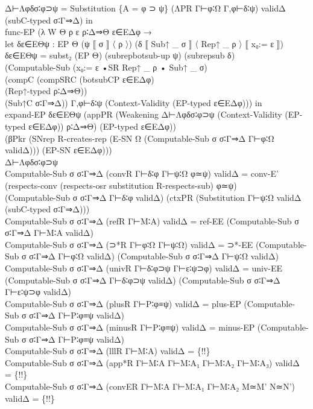 {\begin{code}
{\>      Δ⊢Λφδσ∶φ⊃ψ = Substitution \{A = φ ⊃ ψ\} (ΛPR Γ⊢φ∶Ω Γ,φ⊢δ∶ψ) validΔ (subC-typed σ∶Γ⇒Δ) in\<\\
\>  func-EP (λ W Θ ρ ε ρ∶Δ⇒Θ ε∈EΔφ → \<\\
\>    let δε∈EΘψ : EP Θ (ψ ⟦ σ ⟧ 〈 ρ 〉) (δ ⟦ Sub↑ \_ σ ⟧ 〈 Rep↑ \_ ρ 〉 ⟦ x₀:= ε ⟧)\<\\
\>        δε∈EΘψ = subst₂ (EP Θ) (subrepbotsub-up ψ) (subrepsub δ) \<\\
\>                 (Computable-Sub (x₀:= ε •SR Rep↑ \_ ρ • Sub↑ \_ σ) \<\\
\>                 (compC (compSRC (botsubCP ε∈EΔφ) \<\\
\>                        (Rep↑-typed ρ∶Δ⇒Θ)) \<\\
\>                 (Sub↑C σ∶Γ⇒Δ)) Γ,φ⊢δ∶ψ (Context-Validity (EP-typed ε∈EΔφ))) in\<\\
\>    expand-EP δε∈EΘψ (appPR (Weakening Δ⊢Λφδσ∶φ⊃ψ (Context-Validity (EP-typed ε∈EΔφ)) ρ∶Δ⇒Θ) (EP-typed ε∈EΔφ))\<\\
\>      (βPkr (SNrep R-creates-rep (E-SN Ω (Computable-Sub σ σ∶Γ⇒Δ Γ⊢φ∶Ω validΔ))) (EP-SN ε∈EΔφ))) \<\\
\>  Δ⊢Λφδσ∶φ⊃ψ\<\\
\>Computable-Sub σ σ∶Γ⇒Δ (convR Γ⊢δ∶φ Γ⊢ψ∶Ω φ≃ψ) validΔ = conv-E' (respects-conv (respects-osr substitution R-respects-sub) φ≃ψ) \<\\
\>  (Computable-Sub σ σ∶Γ⇒Δ Γ⊢δ∶φ validΔ) (ctxPR (Substitution Γ⊢ψ∶Ω validΔ (subC-typed σ∶Γ⇒Δ)))\<\\
\>Computable-Sub σ σ∶Γ⇒Δ (refR Γ⊢M∶A) validΔ = ref-EE (Computable-Sub σ σ∶Γ⇒Δ Γ⊢M∶A validΔ)\<\\
\>Computable-Sub σ σ∶Γ⇒Δ (⊃*R Γ⊢φ∶Ω Γ⊢ψ∶Ω) validΔ = ⊃*-EE (Computable-Sub σ σ∶Γ⇒Δ Γ⊢φ∶Ω validΔ) (Computable-Sub σ σ∶Γ⇒Δ Γ⊢ψ∶Ω validΔ)\<\\
\>Computable-Sub σ σ∶Γ⇒Δ (univR Γ⊢δ∶φ⊃ψ Γ⊢ε∶ψ⊃φ) validΔ = univ-EE (Computable-Sub σ σ∶Γ⇒Δ Γ⊢δ∶φ⊃ψ validΔ) (Computable-Sub σ σ∶Γ⇒Δ Γ⊢ε∶ψ⊃φ validΔ)\<\\
\>Computable-Sub σ σ∶Γ⇒Δ (plusR Γ⊢P∶φ≡ψ) validΔ = plus-EP (Computable-Sub σ σ∶Γ⇒Δ Γ⊢P∶φ≡ψ validΔ)\<\\
\>Computable-Sub σ σ∶Γ⇒Δ (minusR Γ⊢P∶φ≡ψ) validΔ = minus-EP (Computable-Sub σ σ∶Γ⇒Δ Γ⊢P∶φ≡ψ validΔ)\<\\
\>Computable-Sub σ σ∶Γ⇒Δ (lllR Γ⊢M∶A) validΔ = \{!!\}\<\\
\>Computable-Sub σ σ∶Γ⇒Δ (app*R Γ⊢M∶A Γ⊢M∶A₁ Γ⊢M∶A₂ Γ⊢M∶A₃) validΔ = \{!!\}\<\\
\>Computable-Sub σ σ∶Γ⇒Δ (convER Γ⊢M∶A Γ⊢M∶A₁ Γ⊢M∶A₂ M≃M' N≃N') validΔ = \{!!\}\<\\
}
\end{code}}
